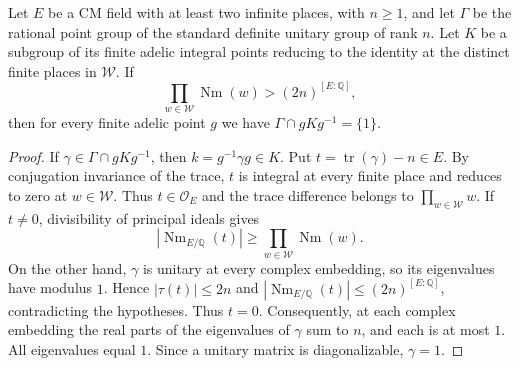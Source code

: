 \begin{lemma}
\label{lem:a-free-congruence-level}
\emitthmsource
Let $E$ be a CM field with at least two infinite places, with $n\ge1$, and let $\Gamma$ be the rational point group of the standard definite unitary group of rank $n$. Let $K$ be a subgroup of its finite adelic integral points reducing to the identity at the distinct finite places in $\mathcal W$. If
\[
 \prod_{w\in\mathcal W}\operatorname{Nm}(w)>(2n)^{[E:\mathbb Q]},
\]
then for every finite adelic point $g$ we have $\Gamma\cap gKg^{-1}=\{1\}$.
\end{lemma}
\begin{proof}
If $\gamma\in\Gamma\cap gKg^{-1}$, then $k=g^{-1}\gamma g\in K$. Put $t=\operatorname{tr}(\gamma)-n\in E$. By conjugation invariance of the trace, $t$ is integral at every finite place and reduces to zero at $w\in\mathcal W$. Thus $t\in\mathcal O_E$ and the trace difference belongs to $\prod_{w\in\mathcal W} w$. If $t\ne0$, divisibility of principal ideals gives
\[
 |\operatorname{Nm}_{E/\mathbb Q}(t)|
 \ge \prod_{w\in\mathcal W}\operatorname{Nm}(w).
\]
On the other hand, $\gamma$ is unitary at every complex embedding, so its eigenvalues have modulus $1$. Hence $|\tau(t)|\le2n$ and $|\operatorname{Nm}_{E/\mathbb Q}(t)|\le(2n)^{[E:\mathbb Q]}$, contradicting the hypotheses. Thus $t=0$. Consequently, at each complex embedding the real parts of the eigenvalues of $\gamma$ sum to $n$, and each is at most $1$. All eigenvalues equal $1$. Since a unitary matrix is diagonalizable, $\gamma=1$.
\end{proof}

